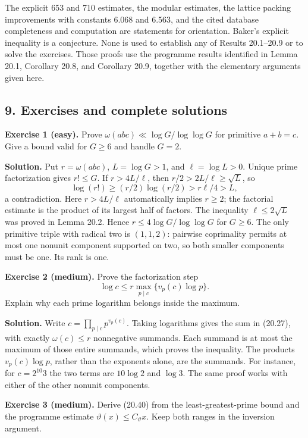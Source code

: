 \documentclass[
  11pt,
  a4paper,
]{article}
\begin{document}
The explicit 653 and 710 estimates, the modular estimates, the lattice
packing improvements with constants 6.068 and 6.563, and the cited
database completeness and computation are statements for orientation.
Baker's explicit inequality is a conjecture. None is used to establish
any of Results 20.1--20.9 or to solve the exercises. Those proofs use
the programme results identified in Lemma 20.1, Corollary 20.8, and
Corollary 20.9, together with the elementary arguments given here.

\subsection{9. Exercises and complete
solutions}\label{exercises-and-complete-solutions}

\textbf{Exercise 1 (easy).} Prove \(\omega(abc)\ll\log G/\log\log G\)
for primitive \(a+b=c\). Give a bound valid for \(G\ge6\) and handle
\(G=2\).

\textbf{Solution.} Put \(r=\omega(abc)\), \(L=\log G>1\), and
\(\ell=\log L>0\). Unique prime factorization gives \(r!\le G\). If
\(r>4L/\ell\), then \(r/2>2L/\ell\ge\sqrt L\), so \[
 \log(r!)\ge(r/2)\log(r/2)>r\ell/4>L,
 \] a contradiction. Here \(r>4L/\ell\) automatically implies \(r\ge2\);
the factorial estimate is the product of its largest half of factors.
The inequality \(\ell\le2\sqrt L\) was proved in Lemma 20.2. Hence
\(r\le4\log G/\log\log G\) for \(G\ge6\). The only primitive triple with
radical two is \((1,1,2)\): pairwise coprimality permits at most one
nonunit component supported on two, so both smaller components must be
one. Its rank is one.

\textbf{Exercise 2 (medium).} Prove the factorization step \[
 \log c\le r\max_{p\mid c}\{v_p(c)\log p\}.
 \] Explain why each prime logarithm belongs inside the maximum.

\textbf{Solution.} Write \(c=\prod_{p\mid c}p^{v_p(c)}\). Taking
logarithms gives the sum in (20.27), with exactly \(\omega(c)\le r\)
nonnegative summands. Each summand is at most the maximum of those
entire summands, which proves the inequality. The products
\(v_p(c)\log p\), rather than the exponents alone, are the summands. For
instance, for \(c=2^{10}3\) the two terms are \(10\log2\) and \(\log3\).
The same proof works with either of the other nonunit components.

\textbf{Exercise 3 (medium).} Derive (20.40) from the
least-greatest-prime bound and the programme estimate
\(\vartheta(x)\le C_\vartheta x\). Keep both ranges in the inversion
argument.
\end{document}

